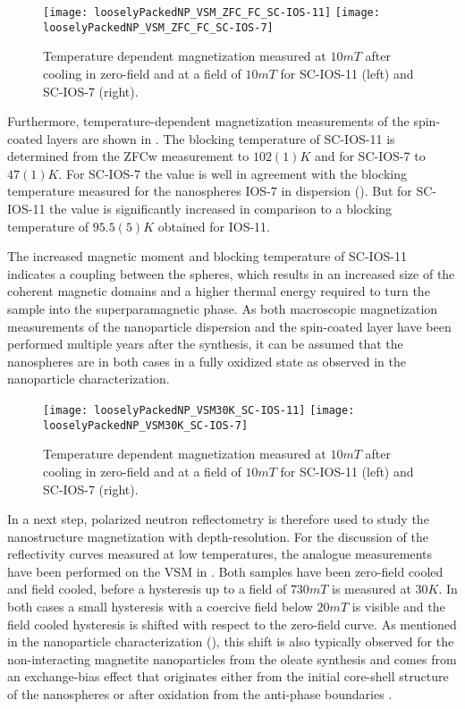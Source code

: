\documentclass[\main/dresen_thesis.tex]{subfiles}
\begin{document}
  \begin{figure}[tb]
    \centering
    \texttt{[image: looselyPackedNP\_VSM\_ZFC\_FC\_SC-IOS-11]}
    \texttt{[image: looselyPackedNP\_VSM\_ZFC\_FC\_SC-IOS-7]}
    \caption{\label{fig:looselyPackedNP:layer:vsmZFCFC}Temperature dependent magnetization measured at $10 \unit{mT}$ after cooling in zero-field and at a field of $10 \unit{mT}$ for SC-IOS-11 (left) and SC-IOS-7 (right).}
  \end{figure}

  Furthermore, temperature-dependent magnetization measurements of the spin-coated layers are shown in .
  The blocking temperature of SC-IOS-11 is determined from the ZFCw measurement to $102(1) \unit{K}$ and for SC-IOS-7 to $47(1) \unit{K}$.
  For SC-IOS-7 the value is well in agreement with the blocking temperature measured for the nanospheres IOS-7 in dispersion ().
  But for SC-IOS-11 the value is significantly increased in comparison to a blocking temperature of $95.5(5) \unit{K}$ obtained for IOS-11.

  The increased magnetic moment and blocking temperature of SC-IOS-11 indicates a coupling between the spheres, which results in an increased size of the coherent magnetic domains and a higher thermal energy required to turn the sample into the superparamagnetic phase.
  As both macroscopic magnetization measurements of the nanoparticle dispersion and the spin-coated layer have been performed multiple years after the synthesis, it can be assumed that the nanospheres are in both cases in a fully oxidized state as observed in the nanoparticle characterization.

  \begin{figure}[tb]
    \centering
    \texttt{[image: looselyPackedNP\_VSM30K\_SC-IOS-11]}
    \texttt{[image: looselyPackedNP\_VSM30K\_SC-IOS-7]}
    \caption{\label{fig:looselyPackedNP:layer:vsm30K}Temperature dependent magnetization measured at $10 \unit{mT}$ after cooling in zero-field and at a field of $10 \unit{mT}$ for SC-IOS-11 (left) and SC-IOS-7 (right).}
  \end{figure}
  In a next step, polarized neutron reflectometry is therefore used to study the nanostructure magnetization with depth-resolution.
  For the discussion of the reflectivity curves measured at low temperatures, the analogue measurements have been performed on the VSM in .
  Both samples have been zero-field cooled and field cooled, before a hysteresis up to a field of $730 \unit{mT}$ is measured at $30 \unit{K}$.
  In both cases a small hysteresis with a coercive field below $20 \unit{mT}$ is visible and the field cooled hysteresis is shifted with respect to the zero-field curve.
  As mentioned in the nanoparticle characterization (), this shift is also typically observed for the non-interacting magnetite nanoparticles from the oleate synthesis and comes from an exchange-bias effect that originates either from the initial core-shell structure of the nanospheres or after oxidation from the anti-phase boundaries \cite{Wetterskog_2013_Anoma}.
\end{document}
